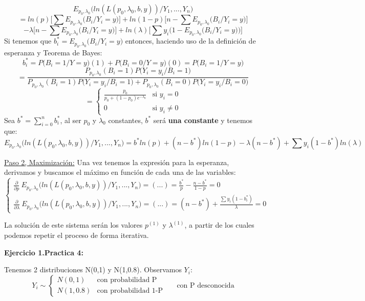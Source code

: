 $$E_{p_0,\lambda_0}\Big(ln(L(p_0,\lambda_0,b,y))\Big/Y_1,...,Y_n\Big)
$$
$$=ln(p)\Bigg[\sum E_{p_0,\lambda_0}\Big(B_i\Big/Y_i=y\Big)\Bigg]+ln(1-p)\Bigg[n-\sum E_{p_0,\lambda_0}\Big(B_i\Big/Y_i=y\Big)\Bigg]$$
$$-\lambda\Bigg[n-\sum E_{p_0,\lambda_0}\Big(B_i\Big/Y_i=y\Big)\Bigg]+ln(\lambda)\Bigg[\sum y_i\Big(1-E_{p_0,\lambda_0}\Big(B_i\Big/Y_i=y\Big)\Big)\Bigg]$$
Si tenemos que $b^*_i=E_{p_0,\lambda_0}\Big(B_i\Big/Y_i=y\Big)$ entonces, haciendo uso de la definición de esperanza y Teorema de Bayes:
$$b^*_i=P\Big(B_i=1\Big/Y=y\Big)(1)+P\Big(B_i=0\Big/Y=y\Big)(0)=P\Big(B_i=1\Big/Y=y\Big)$$
$$=\frac{P_{p_0,\lambda_0}(B_i=1)P\Big(Y_i=y_i\Big/B_i=1\Big)}{P_{p_0,\lambda_0}(B_i=1)P\Big(Y_i=y_i\Big/B_i=1\Big)+P_{p_0,\lambda_0}(B_i=0)P\Big(Y_i=y_i\Big/B_i=0\Big)}
$$
$$=\begin{cases}
    \frac{p_0}{p_0+(1-p_0)e^{-\lambda_0}} & \text{si } y_i=0 \\
    0 & \text{si }y_i \neq 0
\end{cases}$$
Sea $b^{*}=\sum_{i=0}^{n}b^{*}_i$, al ser $p_0$ y $\lambda_0$ constantes, $b^{*}$ será \textbf{una constante} y tenemos que:
$$E_{p_0,\lambda_0}\Big(ln(L(p_0,\lambda_0,b,y))\Big/Y_1,...,Y_n\Big)=b^{*}ln(p)+(n-b^{*})ln(1-p)-\lambda(n-b^{*})+\sum y_i(1-b^{*})ln(\lambda)$$

\noindent\underline{Paso 2, Maximización:} Una vez tenemos la expresión para la esperanza, derivamos y buscamos el máximo en función de cada una de las variables:
$$\begin{cases}
    \frac{\partial}{\partial p}\ E_{p_0,\lambda_0}\Big(ln(L(p_0,\lambda_0,b,y))\Big/Y_1,...,Y_n\Big)=(...)=\frac{b^{*}}{p}-\frac{n-b^{*}}{1-p}=0\\
    \frac{\partial}{\partial \lambda}\ E_{p_0,\lambda_0}\Big(ln(L(p_0,\lambda_0,b,y))\Big/Y_1,...,Y_n\Big)=(...)=(n-b^{*})+\frac{\sum y_i(1-b_i^{*})}{\lambda}=0
\end{cases}$$

La solución de este sistema serán los valores $p^{(1)}$ y $\lambda^{(1)}$, a partir de los cuales podemos repetir el proceso de forma iterativa.

\textbf{Ejercicio 1.Practica 4:}

Tenemos 2 distribuciones N(0,1) y N(1,0.8). Observamos $Y_i$:
\[
Y_i \sim \left\{
    \begin{matrix}
        N(0,1) & \text{con probabilidad P}\\
        N(1,0.8) & \text{con probabilidad 1-P}
    \end{matrix}
\right.\
\quad
\text{ con P desconocida}
\]

